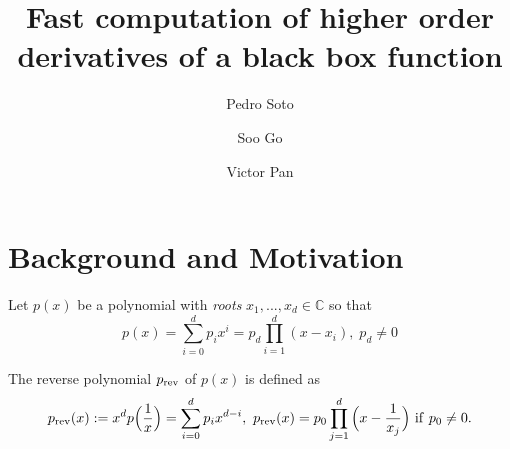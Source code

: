 \documentclass[runningheads]{llncs}
\begin{document}
%
\title{Fast computation of higher  order derivatives of a black box  function}
%
%
\author{Pedro Soto \and
Soo Go \and
Victor Pan}
%
%
%
\maketitle              %
%
\begin{abstract}

\end{abstract}
%
%
%

\section{Background and Motivation}\label{srrapp}
Let $p(x)$ be a polynomial with \emph{roots} $x_1, ..., x_d \in \mathbb{C}$ so that
\begin{equation}\label{eqpoly}
p(x) = \sum_{i=0}^{d} p_i x^i = p_d \prod_{i=1}^d (x-x_i), \; p_d \neq 0
\end{equation} 


The reverse polynomial $p_{\rm rev}$ of $p(x)$ is defined as 
 \begin{equation}\label{eqpolyrev}
p_{\rm rev}(x):=x^dp\Big(\frac{1}{x}\Big)=\sum_{i=0}^dp_ix^{d-i},~
p_{\rm rev}(x)=p_0\prod_{j=1}^d\Big(x-\frac{1}{x_j}\Big)~{\rm if}~p_0\neq 0.
\end{equation} 

\end{document}
